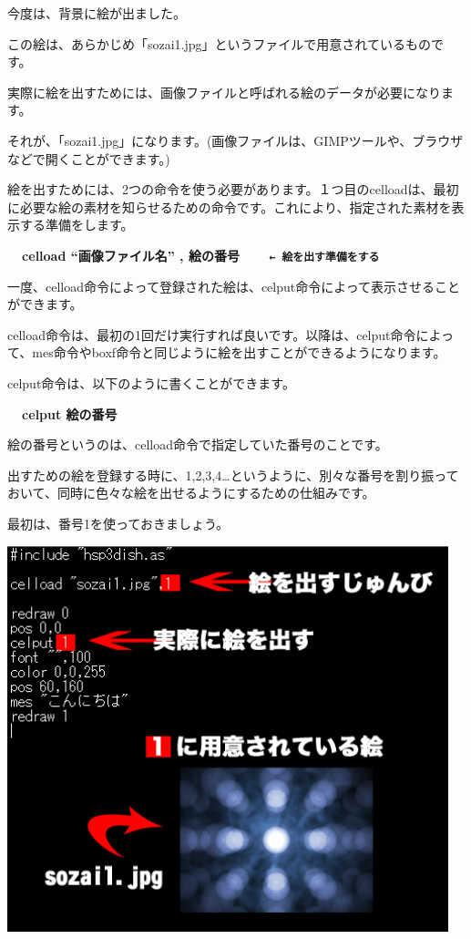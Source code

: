 \documentclass[a4paper,12pt]{jarticle}
\begin{document}
\bigskip
\bigskip
\bigskip

今度は、背景に絵が出ました。

この絵は、あらかじめ「sozai1.jpg」というファイルで用意されているものです。

実際に絵を出すためには、画像ファイルと呼ばれる絵のデータが必要になります。

それが、「sozai1.jpg」になります。(画像ファイルは、GIMPツールや、ブラウザなどで開くことができます。)


\bigskip

絵を出すためには、2つの命令を使う必要があります。１つ目のcelloadは、最初に必要な絵の素材を知らせるための命令です。これにより、指定された素材を表示する準備をします。


\bigskip

{\bfseries
\ \ celload “画像ファイル名” , 絵の番号\ \ \ \ \texttt{← 絵を出す準備をする}}

\bigskip

一度、celload命令によって登録された絵は、celput命令によって表示させることができます。

celload命令は、最初の1回だけ実行すれば良いです。以降は、celput命令によって、mes命令やboxf命令と同じように絵を出すことができるようになります。


\bigskip

celput命令は、以下のように書くことができます。


\bigskip

{\bfseries
\ \ celput 絵の番号}

\bigskip

絵の番号というのは、celload命令で指定していた番号のことです。

出すための絵を登録する時に、1,2,3,4…というように、別々な番号を割り振っておいて、同時に色々な絵を出せるようにするための仕組みです。

最初は、番号1を使っておきましょう。

\bigskip
\bigskip

\begin{minipage}{9.781cm}
\centering
{\upshape
\includegraphics[keepaspectratio,width=12.806cm,height=11.206cm]{text04-img/text04-img013.png}}
\end{minipage}
\end{document}
